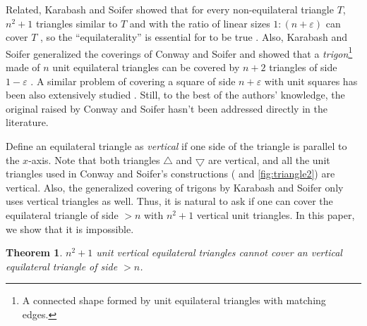 \documentclass[a4paper]{amsart}
\theoremstyle{plain}
\newtheorem{theorem}{Theorem}
\theoremstyle{definition}
\begin{document}

Related, Karabash and Soifer showed that for every non-equilateral triangle \(T\), \(n^2 + 1\) triangles similar to \(T\) and with the ratio of linear sizes \(1: (n + \varepsilon)\) can cover \(T\) \cite{karabash2005covering},
so the ``equilaterality'' is essential for  to be true \cite{conway2004coverup, soifer2009coffee}.
Also, Karabash and Soifer generalized the coverings of Conway and Soifer and showed that a \emph{trigon}\footnote{A connected shape formed by unit equilateral triangles with matching edges.} made of \(n\) unit equilateral triangles can be covered by \(n + 2\) triangles of side \(1 - \varepsilon\) \cite{karabash2005covering}.
A similar problem of covering a square of side \(n + \varepsilon\) with unit squares has been also extensively studied \cite{karabash2006sharp, karabash2008note, chung2009packing, wang2016new, chungEfficientPackingsUnit2020}.
Still, to the best of the authors' knowledge, the original  raised by Conway and Soifer hasn't been addressed directly in the literature.

Define an equilateral triangle as \emph{vertical} if one side of the triangle is parallel to the $x$-axis.
Note that both triangles $\bigtriangleup$ and $\bigtriangledown$ are vertical, and all the unit triangles used in Conway and Soifer's constructions ( and \ref{fig:triangle2}) are vertical.
Also, the generalized covering of trigons by Karabash and Soifer \cite{karabash2005covering} only uses vertical triangles as well.
Thus, it is natural to ask if one can cover the equilateral triangle of side \(> n\) with \(n^2 + 1\) vertical unit triangles.
In this paper, we show that it is impossible.

\begin{theorem}

\(n^2 + 1\) unit vertical equilateral triangles cannot cover an vertical equilateral triangle of side \(> n\).

\label{thm:triangle-cover-cor}
\end{theorem}
\end{document}
